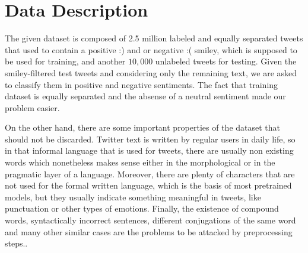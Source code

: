\section{Data Description}
\label{sec:data_description}
The given dataset is composed of 2.5 million labeled and equally separated tweets that used to contain a positive :) and or negative :( smiley, which is supposed to be used for training, and another $10,000$ unlabeled tweets for testing. 
Given the smiley-filtered test tweets and considering only the remaining text, we are asked to classify them in positive and negative sentiments. 
The fact that training dataset is equally separated and the absense of a neutral sentiment made our problem easier. 

On the other hand, there are some important properties of the dataset that should not be discarded. 
Twitter text is written by regular users in daily life, so in that informal language that is used for tweets, there are usually non existing words which nonetheless makes sense either in the morphological or in the pragmatic layer of a language. 
Moreover, there are plenty of characters that are not used for the formal written language, which is the basis of most pretrained models, but they usually indicate something meaningful in tweets, like punctuation or other types of emotions. 
Finally, the existence of compound words, syntactically incorrect sentences, different conjugations of the same word and many other similar cases are the problems to be attacked by preprocessing steps..
